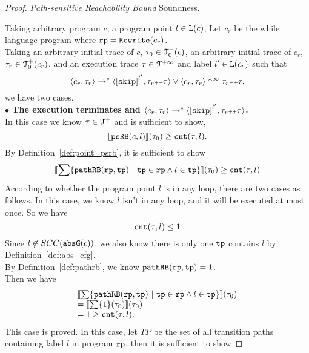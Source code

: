 \begin{proof} \emph{Path-sensitive Reachability Bound} Soundness.

    Taking arbitrary program $c$, a program point $l \in \mathtt{L}(c)$,
    Let $c_r$ be the while language program where $\mathtt{rp} = \mathtt{Rewrite}(c_r)$.
    \\
    Taking an arbitrary initial trace of $c$, $\mathtt{\tau}_0 \in \mathcal{T}^{+}_0(c)$, an arbitrary initial trace of $c_r$, $\mathtt{\tau}_r \in \mathcal{T}^{+}_0(c_r)$, and an execution trace $\mathtt{\tau} \in \mathcal{T}^{+\infty}$ and label $l' \in \mathtt{L}(c_r)$
   such that 
   \[
    \config{{c_r}, \trace_r} \to^{*} \config{\clabel{\eskip}^{l'}, \trace_r \tracecat \trace} \lor \config{c_r, \trace_r} \uparrow^{\infty} \trace_r \tracecat \trace,
    \]
   we have two cases.
  \\
  \textbf{$\bullet$ The execution terminates and {$\config{{c_r}, \trace_r} \to^{*} \config{\clabel{\eskip}^{l'}, \trace_r \tracecat \trace}$}.} 
  \\
  In this case we know $\mathtt{\tau} \in \mathcal{T}^{+}$ and is sufficient to show,
    \[
    \llbracket \mathtt{psRB}(c, l) \rrbracket(\mathtt{\tau}_0) \geq \mathtt{cnt}(\mathtt{\tau}, l) .
    \]
    By Definition~\ref{def:point_psrb}, it is sufficient to show 
    \[
    \econfig{
        \sum \left\{ \inoutB(\rprog, \tpath) ~\vert~ \tpath \in \rprog \land l \in \tpath \right\}
        }(\trace_0)  \geq  \counter(\trace, l)
    \]
    According to whether the program point $l$ is in any loop, there are two cases as follows.
    In this case, we know $l$ isn't in any loop, and it will be executed at most once. So we have
    \[ 
        \mathtt{cnt}(\mathtt{\tau}, l) \leq 1
    \]
    Since $l \not\in SCC(\mathtt{abs}{\mathtt{G}}(c))$, we also know there is only one $\mathtt{tp}$ contains $l$ by Definition~\ref{def:abs_cfg}.
    \\
    By Definition~\ref{def:pathrb}, we know $\mathtt{pathRB}(\mathtt{rp}, \mathtt{tp}) = 1$.
    \\
    Then we have 
    \[
        \begin{array}{l}
        \econfig{
        \sum \left\{ \inoutB(\rprog, \tpath) ~\vert~ \tpath \in \rprog \land l \in \tpath \right\}
        }(\trace_0)
        \\ =  \econfig{ \sum \left\{ 1 \right\}(\trace_0)}(\trace_0)
        \\ =  1 \geq \counter(\trace, l).
        \end{array}
        \]
    This case is proved.
    In this case, let $TP$ be the set of all transition paths containing 
    label $l$ in program $\mathtt{rp}$, then it is sufficient to show 

\end{proof}
